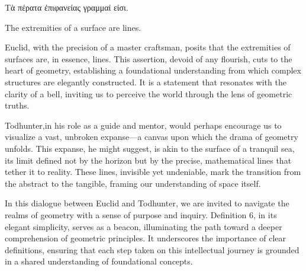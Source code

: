 
\begin{defin}
\textgreek{Τὰ πέρατα ἐπιφανείας γραμμαί εἰσι.}

The extremities of a surface are lines.
\end{defin}

Euclid, with the precision of a master craftsman, posits that the extremities of surfaces are, in essence, lines. This assertion, devoid of any flourish, cuts to the heart of geometry, establishing a foundational understanding from which complex structures are elegantly constructed. It is a statement that resonates with the clarity of a bell, inviting us to perceive the world through the lens of geometric truths.

Todhunter,in his role as a guide and mentor, would perhaps encourage us to visualize a vast, unbroken expanse—a canvas upon which the drama of geometry unfolds. This expanse, he might suggest, is akin to the surface of a tranquil sea, its limit defined not by the horizon but by the precise, mathematical lines that tether it to reality. These lines, invisible yet undeniable, mark the transition from the abstract to the tangible, framing our understanding of space itself.

In this dialogue between Euclid and Todhunter, we are invited to navigate the realms of geometry with a sense of purpose and inquiry. Definition 6, in its elegant simplicity, serves as a beacon, illuminating the path toward a deeper comprehension of geometric principles. It underscores the importance of clear definitions, ensuring that each step taken on this intellectual journey is grounded in a shared understanding of foundational concepts.

\clearpage